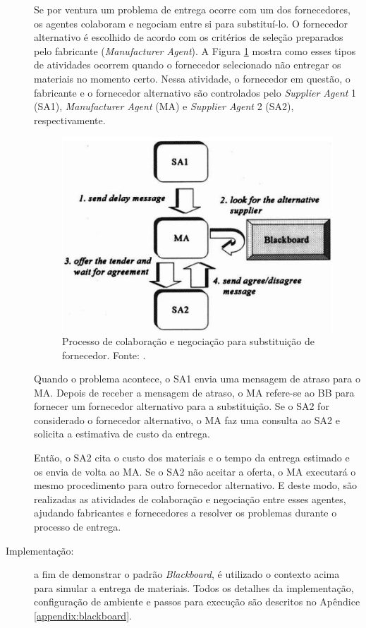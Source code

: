 \begin{description}
Se por ventura um problema de entrega ocorre com um dos fornecedores, os agentes colaboram e negociam entre si para substituí-lo. O fornecedor alternativo é escolhido de acordo com os critérios de seleção preparados pelo fabricante (\textit{Manufacturer Agent}). A Figura \ref{fig:blackboard_process} mostra como esses tipos de atividades ocorrem quando o fornecedor selecionado não entregar os materiais no momento certo. Nessa atividade, o fornecedor em questão, o fabricante e o fornecedor alternativo são controlados pelo \textit{Supplier Agent} 1 (SA1), \textit{Manufacturer Agent} (MA) e \textit{Supplier Agent} 2 (SA2), respectivamente.

\begin{figure}[h!]
    \centering
    \includegraphics[scale=0.30]{figuras/blackboard/blackboard_process.png}
    \caption{Processo de colaboração e negociação para substituição de fornecedor. Fonte: .}
    \label{fig:blackboard_process}
\end{figure}


Quando o problema acontece, o SA1 envia uma mensagem de atraso para o MA. Depois de receber a mensagem de atraso, o MA refere-se ao BB para fornecer um fornecedor alternativo para a substituição. Se o SA2 for considerado o fornecedor alternativo, o MA faz uma consulta ao SA2 e solicita a estimativa de custo da entrega.

Então, o SA2 cita o custo dos materiais e o tempo da entrega estimado e os envia de volta ao MA. Se o SA2 não aceitar a oferta, o MA executará o mesmo procedimento para outro fornecedor alternativo. E deste modo, são realizadas as atividades de colaboração e negociação entre esses agentes, ajudando fabricantes e fornecedores a resolver os problemas durante o processo de entrega.

\item[Implementação:] a fim de demonstrar o padrão \textit{Blackboard}, é utilizado o contexto acima para simular a entrega de materiais. Todos os detalhes da implementação, configuração de ambiente e passos para execução são descritos no Apêndice \ref{appendix:blackboard}.

\end{description}

